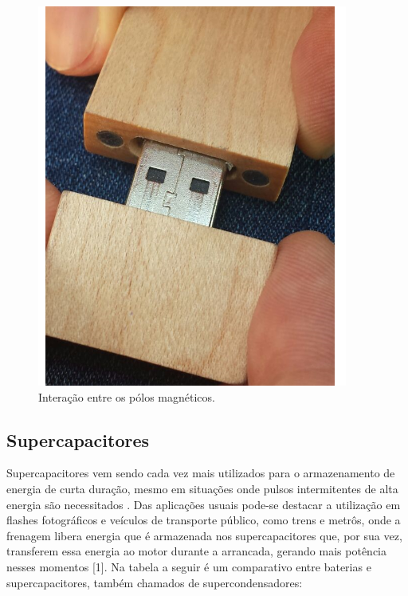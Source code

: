  \begin{figure}[H]
	\centering
	\includegraphics[scale=0.5]{figuras/interacaopolosmagneticos}
	\caption{Interação entre os pólos magnéticos.}
	\label{img:interacaopolosmagneticos}
\end{figure}

\subsection{Supercapacitores}
Supercapacitores vem sendo cada vez mais utilizados para o armazenamento de energia de curta duração, mesmo em situações onde pulsos intermitentes de alta energia são necessitados \cite{supercampos}.
Das aplicações usuais pode-se destacar a utilização em flashes fotográficos e veículos de transporte público, como trens e metrôs, onde a frenagem libera energia que é armazenada nos supercapacitores que, por sua vez, transferem essa energia ao motor durante a arrancada, gerando  mais potência nesses momentos [1].
Na tabela a seguir é um comparativo entre baterias e supercapacitores, também chamados de supercondensadores: 

